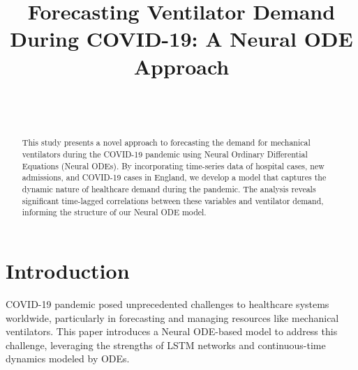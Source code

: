 \documentclass[lettersize, journal]{IEEEtran}
\begin{document}
\title{Forecasting Ventilator Demand During COVID-19: A Neural ODE Approach}

\author{
    \\
    \\
}
\maketitle

\begin{abstract}
This study presents a novel approach to forecasting the demand for mechanical ventilators during the COVID-19 pandemic using Neural Ordinary Differential Equations (Neural ODEs). By incorporating time-series data of hospital cases, new admissions, and COVID-19 cases in England, we develop a model that captures the dynamic nature of healthcare demand during the pandemic. The analysis reveals significant time-lagged correlations between these variables and ventilator demand, informing the structure of our Neural ODE model.
\end{abstract}

\section{Introduction}
 COVID-19 pandemic posed unprecedented challenges to healthcare systems worldwide, particularly in forecasting and managing resources like mechanical ventilators. This paper introduces a Neural ODE-based model to address this challenge, leveraging the strengths of LSTM networks and continuous-time dynamics modeled by ODEs.
\end{document}

